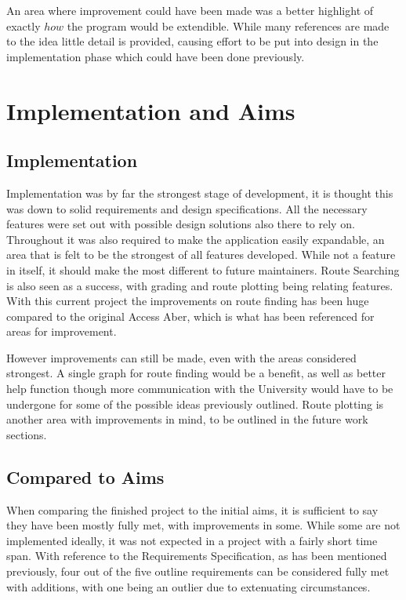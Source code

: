 An area where improvement could have been made was a better highlight of exactly $how$ the program would be extendible. While many references are made to the idea little detail is provided, causing effort to be put into design in the implementation phase which could have been done previously. 
\section{Implementation and Aims}
\subsection{Implementation}
Implementation was by far the strongest stage of development, it is thought this was down to solid requirements and design specifications. All the necessary features were set out with possible design solutions also there to rely on. Throughout it was also required to make the application easily expandable, an area that is felt to be the strongest of all features developed. While not a feature in itself, it should make the most different to future maintainers. Route Searching is also seen as a success, with grading and route plotting being relating features. With this current project the improvements on route finding has been huge compared to the original Access Aber\cite{aa}, which is what has been referenced for areas for improvement. 

However improvements can still be made, even with the areas considered strongest. A single graph for route finding would be a benefit, as well as better help function though more communication with the University would have to be undergone for some of the possible ideas previously outlined. Route plotting is another area with improvements in mind, to be outlined in the future work sections. 
\subsection{Compared to Aims}
When comparing the finished project to the initial aims, it is sufficient to say they have been mostly fully met, with improvements in some. While some are not implemented ideally, it was not expected in a project with a fairly short time span. With reference to the Requirements Specification, as has been mentioned previously, four out of the five outline requirements can be considered fully met with additions, with one being an outlier due to extenuating circumstances. 

